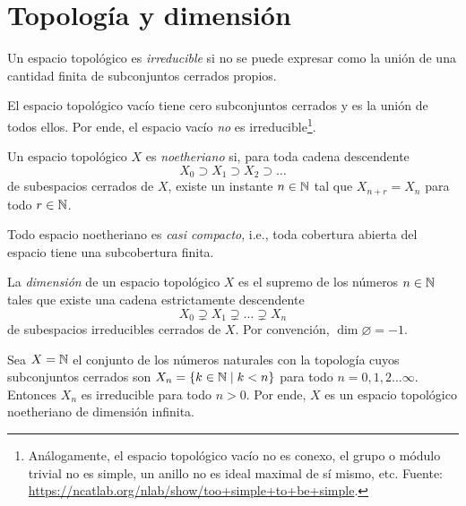 \section{Topología y dimensión}

\begin{definition}
Un espacio topológico es \textit{irreducible} si no se puede expresar como la unión de una cantidad finita de subconjuntos cerrados propios.
\end{definition}

\begin{remark}
El espacio topológico vacío tiene cero subconjuntos cerrados y es la unión de todos ellos. Por ende, el espacio vacío \textit{no} es irreducible\footnote{Análogamente, el espacio topológico vacío no es conexo, el grupo o módulo trivial no es simple, un anillo no es ideal maximal de sí mismo, etc. Fuente: \url{https://ncatlab.org/nlab/show/too+simple+to+be+simple}.}.
\end{remark}

\begin{definition}
Un espacio topológico $X$ es \textit{noetheriano} si, para toda cadena descendente
$$X_0 \supset X_1 \supset X_2 \supset \dots$$
de subespacios cerrados de $X$, existe un instante $n \in \mathbb N$ tal que $X_{n+r} = X_n$ para todo $r \in \mathbb N$.
\end{definition}

\begin{remark}
Todo espacio noetheriano es \textit{casi compacto}, i.e., toda cobertura abierta del espacio tiene una subcobertura finita.
\end{remark}

\begin{definition}
La \textit{dimensión} de un espacio topológico $X$ es el supremo de los números $n \in \mathbb N$ tales que existe una cadena estrictamente descendente
$$X_0 \supsetneq X_1 \supsetneq \dots \supsetneq X_n$$
de subespacios irreducibles cerrados de $X$. Por convención, $\dim \varnothing = -1$.
\end{definition}

\begin{example}
Sea $X = \mathbb N$ el conjunto de los números naturales con la topología cuyos subconjuntos cerrados son $X_n = \{ k \in \mathbb N \mid k < n \}$ para todo $n = 0, 1, 2 \dots \infty$. Entonces $X_n$ es irreducible para todo $n > 0$. Por ende, $X$ es un espacio topológico noetheriano de dimensión infinita.
\end{example}

